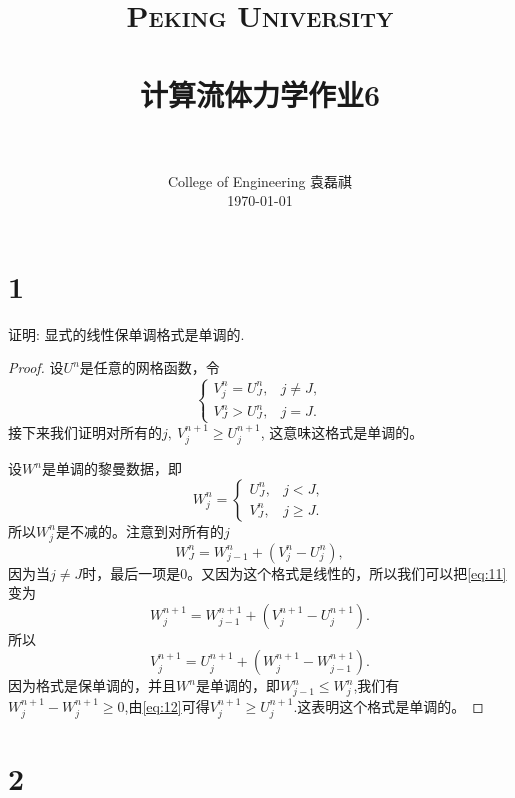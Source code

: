 \documentclass[12pt]{article}
\title{
		\vspace{-1in} 	
		\usefont{OT1}{bch}{b}{n}
		\normalfont \normalsize \textsc{\LARGE Peking University}\\[0.2cm] %
		\horrule{0.5pt} \\[0.2cm]
		\huge \bfseries{计算流体力学作业6} \\[-0.2cm]
		\horrule{2pt} \\[0.2cm]
}
\author{
		\normalfont 								\normalsize
		College of Engineering \quad 2001111690  \quad 袁磊祺\\	\normalsize
        \today
}
\date{}
\begin{document}


\maketitle

\section{1}


证明: 显式的线性保单调格式是单调的.


\begin{proof}

设$U^n$是任意的网格函数，令
\begin{equation}
	\begin{cases}
		V_j^n=U^n_J, &j\not= J,\\
		V^n_J>U^n_J, &j=J.
	\end{cases}
\end{equation}
接下来我们证明对所有的$j,\ V^{n+1}_j\geq U_j^{n+1}$, 这意味这格式是单调的。

设$W^n$是单调的黎曼数据，即
\begin{equation}
	W^n_j=\begin{cases}
		U^n_J, &j<J,\\
		V_J^n,&j\geq J.
	\end{cases}
\end{equation}
所以$W^n_j$是不减的。注意到对所有的$j$
\begin{equation}
	W^n_J = W^n_{j-1}+\left(V_j^n-U_j^n\right),
	\label{eq:11}
\end{equation}
因为当$j\not= J$时，最后一项是0。又因为这个格式是线性的，所以我们可以把\cref{eq:11}变为
\begin{equation}
	W^{n+1}_j=W^{n+1}_{j-1}+\left(V^{n+1}_j-U^{n+1}_j\right).
\end{equation}
所以
\begin{equation}
	V^{n+1}_j=U^{n+1}_j+\left(W^{n+1}_j-W^{n+1}_{j-1}\right).
	\label{eq:12}
\end{equation}
因为格式是保单调的，并且$W^n$是单调的，即$W^n_{j-1}\leqslant W^n_j$,我们有$W^{n+1}_{j} - W^{n+1}_j \geq 0 $,由\cref{eq:12}可得$V_j^{n+1}\geq U_j^{n+1}$.这表明这个格式是单调的。
	
\end{proof}


\section{2}
\end{document}
